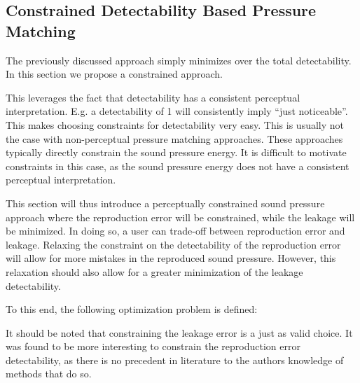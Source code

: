 \subsection{Constrained Detectability Based Pressure Matching}
The previously discussed approach simply minimizes over the total detectability.
In this section we propose a constrained approach.

This leverages the fact that detectability has a consistent perceptual interpretation.
E.g. a detectability of 1 will consistently imply ``just noticeable''.
This makes choosing constraints for detectability very easy.
This is usually not the case with non-perceptual pressure matching approaches.
These approaches typically directly constrain the sound pressure energy.
It is difficult to motivate constraints in this case, as the sound pressure energy does not have a consistent perceptual interpretation.

This section will thus introduce a perceptually constrained sound pressure approach where the reproduction error will be constrained,
while the leakage will be minimized.
In doing so, a user can trade-off between reproduction error and leakage. 
Relaxing the constraint on the detectability of the reproduction error will allow for more mistakes in the reproduced sound pressure.
However, this relaxation should also allow for a greater minimization of the leakage detectability.

To this end, the following optimization problem is defined:

It should be noted that constraining the leakage error is a just as valid choice.
It was found to be more interesting to constrain the reproduction error detectability, as there is no precedent in literature to the authors knowledge of methods 
that do so.
